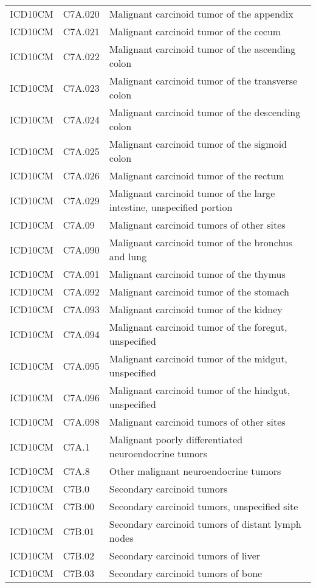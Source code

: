 \begin{table}[ht]
\begin{tabular}{lll}
  ICD10CM & C7A.020 & Malignant carcinoid tumor of the appendix \\ 
  ICD10CM & C7A.021 & Malignant carcinoid tumor of the cecum \\ 
  ICD10CM & C7A.022 & Malignant carcinoid tumor of the ascending colon \\ 
  ICD10CM & C7A.023 & Malignant carcinoid tumor of the transverse colon \\ 
  ICD10CM & C7A.024 & Malignant carcinoid tumor of the descending colon \\ 
  ICD10CM & C7A.025 & Malignant carcinoid tumor of the sigmoid colon \\ 
  ICD10CM & C7A.026 & Malignant carcinoid tumor of the rectum \\ 
  ICD10CM & C7A.029 & Malignant carcinoid tumor of the large intestine, unspecified portion \\ 
  ICD10CM & C7A.09 & Malignant carcinoid tumors of other sites \\ 
  ICD10CM & C7A.090 & Malignant carcinoid tumor of the bronchus and lung \\ 
  ICD10CM & C7A.091 & Malignant carcinoid tumor of the thymus \\ 
  ICD10CM & C7A.092 & Malignant carcinoid tumor of the stomach \\ 
  ICD10CM & C7A.093 & Malignant carcinoid tumor of the kidney \\ 
  ICD10CM & C7A.094 & Malignant carcinoid tumor of the foregut, unspecified \\ 
  ICD10CM & C7A.095 & Malignant carcinoid tumor of the midgut, unspecified \\ 
  ICD10CM & C7A.096 & Malignant carcinoid tumor of the hindgut, unspecified \\ 
  ICD10CM & C7A.098 & Malignant carcinoid tumors of other sites \\ 
  ICD10CM & C7A.1 & Malignant poorly differentiated neuroendocrine tumors \\ 
  ICD10CM & C7A.8 & Other malignant neuroendocrine tumors \\ 
  ICD10CM & C7B.0 & Secondary carcinoid tumors \\ 
  ICD10CM & C7B.00 & Secondary carcinoid tumors, unspecified site \\ 
  ICD10CM & C7B.01 & Secondary carcinoid tumors of distant lymph nodes \\ 
  ICD10CM & C7B.02 & Secondary carcinoid tumors of liver \\ 
  ICD10CM & C7B.03 & Secondary carcinoid tumors of bone \\ 

\end{tabular}
\end{table}
